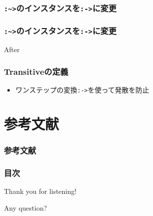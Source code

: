 \begin{frame}[fragile]
  \frametitle{\lstinline|:~>|のインスタンスを\lstinline|:->|に変更}

\end{frame}

\begin{frame}[fragile]
  \frametitle{\lstinline|:~>|のインスタンスを\lstinline|:->|に変更}

  \begin{block}{After}
    
  \end{block}
\end{frame}


\begin{frame}[fragile]
  \frametitle{Transitiveの定義}
 

  \begin{itemize}
    \item<3-> ワンステップの変換\lstinline|:->|を使って発散を防止
  \end{itemize}

\end{frame}

\section*{参考文献}
\begin{frame}
  \frametitle{参考文献}

  \nocite{*}
  
  
\end{frame}

\begin{frame}
  \frametitle{目次}

  \tableofcontents[hideallsubsections]
\end{frame}

\begin{frame}
  \centering
  {\Huge Thank you for listening!}

  \quad \quad

  {\Huge Any question?}
\end{frame}


